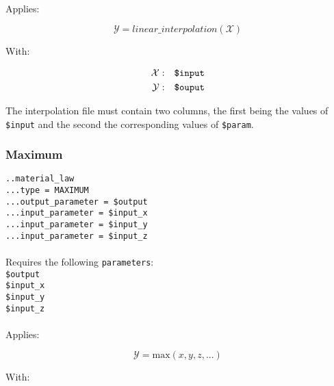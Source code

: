 \documentclass[10pt]{article}
\begin{document}
\paragraph{}Applies:

\begin{equation}
	\mathcal{Y} = linear\_interpolation(\mathcal{X})
\end{equation}

With:

\begin{eqnarray}
	\mathcal{X} & : & \verb+$input+ \notag \\
	\mathcal{Y} & : & \verb+$ouput+\notag  
\end{eqnarray}

The interpolation file must contain two columns, the first being the values of \verb+$input+ and the second the corresponding values of \verb+$param+.

\subsubsection{Maximum}

\noindent \verb+..material_law+\\
\verb+...type = MAXIMUM+\\
\verb+...output_parameter = $output+\\
\verb+...input_parameter = $input_x+\\
\verb+...input_parameter = $input_y+\\
\verb+...input_parameter = $input_z+

\paragraph{}Requires the following \verb+parameters+:\\

\noindent \verb+$output+\\
\verb+$input_x+\\
\verb+$input_y+\\
\verb+$input_z+

\paragraph{}Applies:

\begin{equation}
	\mathcal{Y} = \mathrm{max}( x,y,z,... )
\end{equation}

With:
\end{document}
